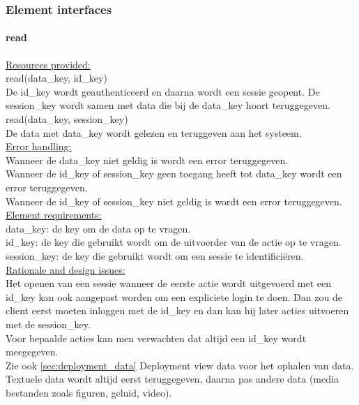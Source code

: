 \documentclass[a4paper,10pt]{article}
\begin{document}
\subsubsection{Element interfaces} 

\paragraph{read}

\underline{Resources provided:}\\
read(data\_key, id\_key)\\
\indent De id\_key wordt geauthenticeerd en daarna wordt een sessie geopent.  De session\_key wordt samen met data die bij de data\_key hoort teruggegeven.\\
read(data\_key, session\_key)\\
\indent De data met data\_key wordt gelezen en teruggeven aan het systeem.\\


\underline{Error handling:}\\
Wanneer de data\_key niet geldig is wordt een error teruggegeven.\\
Wanneer de id\_key of session\_key geen toegang heeft tot data\_key wordt een error teruggegeven.\\
Wanneer de id\_key of session\_key niet geldig is wordt een error teruggegeven.\\

\underline{Element requirements:}\\
data\_key: de key om de data op te vragen.\\
id\_key: de key die gebruikt wordt om de uitvoerder van de actie op te vragen.\\
session\_key: de key die gebruikt wordt om een sessie te identifici\"{e}ren.\\

\underline{Rationale and design issues:}\\
Het openen van een sessie wanneer de eerste actie wordt uitgevoerd met een id\_key kan ook aangepast worden om een expliciete login te doen.  Dan zou de client eerst moeten inloggen met de id\_key en dan kan hij later acties uitvoeren met de session\_key.\\
Voor bepaalde acties kan men verwachten dat altijd een id\_key wordt meegegeven.\\
Zie ook \ref{sec:deployment_data} Deployment view data voor het ophalen van data.  Textuele data wordt altijd eerst teruggegeven, daarna pas andere data (media bestanden zoals figuren, geluid, video).
\end{document}
